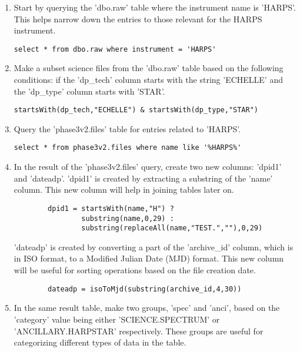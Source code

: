 \documentclass[a4paper,12pt]{article}
\begin{document}
\begin{enumerate}
\item 
Start by querying the 'dbo.raw' table where the instrument name is 'HARPS'. This helps narrow down the entries to those relevant for the HARPS instrument.
\begin{verbatim}
select * from dbo.raw where instrument = 'HARPS'
\end{verbatim}

\item 
    Make a subset science files from the 'dbo.raw' table based on the following conditions: if the 'dp\_tech' column starts with the string 'ECHELLE' and the 'dp\_type' column starts with 'STAR'.
\begin{verbatim}
startsWith(dp_tech,"ECHELLE") & startsWith(dp_type,"STAR")
\end{verbatim}
    
\item 
    Query the 'phase3v2.files' table for entries related to 'HARPS'.
\begin{verbatim}
select * from phase3v2.files where name like '%HARPS%'
\end{verbatim}

\item 
    In the result of the 'phase3v2.files' query, create two new columns: 'dpid1' and 'dateadp'. 'dpid1' is created by extracting a substring of the 'name' column. 
This new column will help in joining tables later on. 
    \begin{verbatim}
        dpid1 = startsWith(name,"H") ? 
                substring(name,0,29) : 
                substring(replaceAll(name,"TEST.",""),0,29)
    \end{verbatim}
    'dateadp' is created by converting a part of the 'archive\_id' column, which is in ISO format, to a Modified Julian Date (MJD) format. 
This new column will be useful for sorting operations based on the file creation date.
    \begin{verbatim}
        dateadp = isoToMjd(substring(archive_id,4,30))
    \end{verbatim}

\item 
    In the same result table, make two groups, 'spec' and 'anci', based on the 'category' value being either 'SCIENCE.SPECTRUM' or \\'ANCILLARY.HARPSTAR' respectively. 
These groups are useful for categorizing different types of data in the table.


\end{enumerate}
\end{document}
